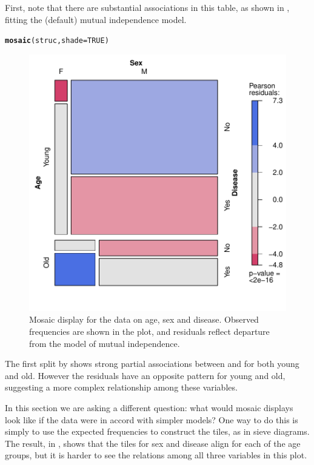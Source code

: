 \documentclass[11pt]{book}\usepackage[]{graphicx}\usepackage[]{color}
\makeatletter
\newcommand{\hlnum}[1]{\textcolor[rgb]{0.686,0.059,0.569}{#1}}%
\newcommand{\hlstd}[1]{\textcolor[rgb]{0.345,0.345,0.345}{#1}}%
\newcommand{\hlkwc}[1]{\textcolor[rgb]{0.333,0.667,0.333}{#1}}%
\newcommand{\hlkwd}[1]{\textcolor[rgb]{0.737,0.353,0.396}{\textbf{#1}}}%
\newenvironment{kframe}{%
 \def\at@end@of@kframe{}%
 \ifinner\ifhmode%
  \def\at@end@of@kframe{\end{minipage}}%
  \begin{minipage}{\columnwidth}%
 \fi\fi%
 \def\FrameCommand##1{\hskip\@totalleftmargin \hskip-\fboxsep
 \colorbox{shadecolor}{##1}\hskip-\fboxsep
     \hskip-\linewidth \hskip-\@totalleftmargin \hskip\columnwidth}%
 \MakeFramed {\advance\hsize-\width
   \@totalleftmargin\z@ \linewidth\hsize
   \@setminipage}}%
 {\par\unskip\endMakeFramed%
 \at@end@of@kframe}
\newenvironment{knitrout}{}{} %
\renewenvironment{knitrout}{\small\renewcommand{\baselinestretch}{.85}}{} %
\makeatother
\begin{document}
First, note that there are substantial associations in this table, as shown in
, fitting the (default) mutual independence model. 
\begin{knitrout}
\color{fgcolor}\begin{kframe}
\begin{alltt}
\hlkwd{mosaic}\hlstd{(struc,} \hlkwc{shade}\hlstd{=}\hlnum{TRUE}\hlstd{)}
\end{alltt}
\end{kframe}\begin{figure}[htbp]


\centerline{\includegraphics[width=.6\textwidth]{ch05/fig/struc-mos1} }

\caption[Mosaic display for the data on age, sex and disease]{Mosaic display for the data on age, sex and disease. Observed frequencies are shown in the plot, and residuals reflect departure from the model of mutual independence.\label{fig:struc-mos1}}
\end{figure}


\end{knitrout}

The first split by  shows strong partial
associations between  and  for both young and old.
However the residuals have an opposite pattern for young and old, suggesting
a more complex relationship among these variables.

In this section we are asking a different question: what would mosaic displays look
like if the data were in accord with simpler models?  One way to do this is simply
to use the expected frequencies to construct the tiles, as in sieve diagrams.
The result, in , shows that the tiles for sex and disease
align for each of the age groups, but it is harder to see the relations among all
three variables in this plot.
\end{document}
